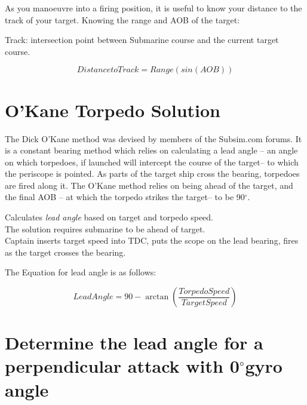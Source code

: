 \documentclass{article}
\newcommand{\degree}{$^{\circ}$}
\begin{document}
As you manoeuvre into a firing position, it is useful to know your distance to the track of your target. Knowing the range and AOB of the target:

Track: intersection point between Submarine course and the current target course.

$$Distance to Track = Range \left( sin(AOB) \right)$$
%
%
%

\section{O'Kane Torpedo Solution}
The Dick O'Kane method was devised by members of the Subsim.com\cite{subsim} forums. It is a constant bearing method which relies on calculating a lead angle -- an angle on which torpedoes, if launched will intercept the course of the target-- to which the periscope is pointed. As parts of the target ship cross the bearing, torpedoes are fired along it. The O'Kane method relies on being ahead of the target, and the final AOB -- at which the torpedo strikes the target-- to be 90\degree .

Calculates \emph{lead angle} based on target and torpedo speed.\\
The solution requires submarine to be ahead of target.\\
Captain inserts target speed into TDC, puts the scope on the lead bearing, fires as the target crosses the bearing.

The Equation for lead angle is as follows:

$$ LeadAngle = 90 - \arctan\left( \frac{Torpedo Speed}{TargetSpeed} \right) $$




\section{Determine the lead angle for a perpendicular attack with 0\degree gyro angle}
\end{document}
